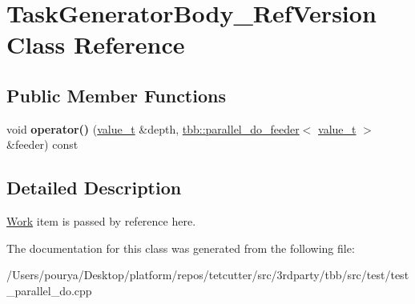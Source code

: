 \hypertarget{classTaskGeneratorBody__RefVersion}{}\section{Task\+Generator\+Body\+\_\+\+Ref\+Version Class Reference}
\label{classTaskGeneratorBody__RefVersion}
\subsection*{Public Member Functions}
\begin{DoxyCompactItemize}
\item 
\hypertarget{classTaskGeneratorBody__RefVersion_a1d0bde27ba222d43c9dfbbbec7b2c414}{}void {\bfseries operator()} (\hyperlink{classvalue__t}{value\+\_\+t} \&depth, \hyperlink{classtbb_1_1parallel__do__feeder}{tbb\+::parallel\+\_\+do\+\_\+feeder}$<$ \hyperlink{classvalue__t}{value\+\_\+t} $>$ \&feeder) const \label{classTaskGeneratorBody__RefVersion_a1d0bde27ba222d43c9dfbbbec7b2c414}

\end{DoxyCompactItemize}


\subsection{Detailed Description}
\hyperlink{structWork}{Work} item is passed by reference here. 

The documentation for this class was generated from the following file\+:\begin{DoxyCompactItemize}
\item 
/\+Users/pourya/\+Desktop/platform/repos/tetcutter/src/3rdparty/tbb/src/test/test\+\_\+parallel\+\_\+do.\+cpp\end{DoxyCompactItemize}
